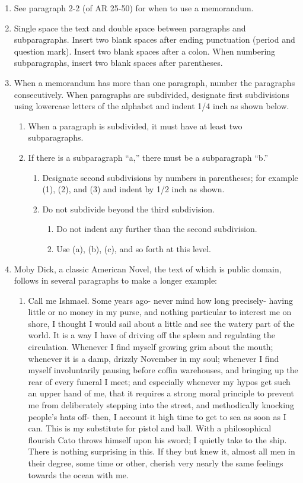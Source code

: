 \documentclass{armymemo}
\author{John Doe}\rank{CPT}\branch{CY}
\begin{document}
\begin{enumerate}
\item See paragraph 2-2 (of AR 25-50) for when to use a memorandum.
\item Single space the text and double space between paragraphs and subparagraphs. Insert two blank spaces after ending punctuation (period and question mark). Insert two blank spaces after a colon. When numbering subparagraphs, insert two blank spaces after parentheses.
\item When a memorandum has more than one paragraph, number the paragraphs consecutively. When paragraphs are subdivided, designate first subdivisions using lowercase letters of the alphabet and indent 1/4 inch as shown below.
  \begin{enumerate}
  \item When a paragraph is subdivided, it must have at least two subparagraphs.
  \item If there is a subparagraph ``a,'' there must be a subparagraph ``b.''
    \begin{enumerate}
    \item Designate second subdivisions by numbers in parentheses; for example (1), (2), and (3) and indent by 1/2 inch as shown.
    \item Do not subdivide beyond the third subdivision.
      \begin{enumerate}
      \item Do not indent any further than the second subdivision.
      \item Use (a), (b), (c), and so forth at this level.
      \end{enumerate}
    \end{enumerate}
  \end{enumerate}
\item Moby Dick, a classic American Novel, the text of which is public domain,
  follows in several paragraphs to make a longer example:

  \begin{enumerate}
  \item Call me Ishmael. Some years ago- never mind how long precisely- having little or
    no money in my purse, and nothing particular to interest me on shore, I thought
    I would sail about a little and see the watery part of the world. It is a way I
    have of driving off the spleen and regulating the circulation. Whenever I find
    myself growing grim about the mouth; whenever it is a damp, drizzly November in
    my soul; whenever I find myself involuntarily pausing before coffin warehouses,
    and bringing up the rear of every funeral I meet; and especially whenever my
    hypos get such an upper hand of me, that it requires a strong moral principle to
    prevent me from deliberately stepping into the street, and methodically knocking
    people's hats off- then, I account it high time to get to sea as soon as I can.
    This is my substitute for pistol and ball. With a philosophical flourish Cato
    throws himself upon his sword; I quietly take to the ship. There is nothing
    surprising in this. If they but knew it, almost all men in their degree, some
    time or other, cherish very nearly the same feelings towards the ocean with me.


\end{enumerate}
\end{enumerate}
\end{document}
